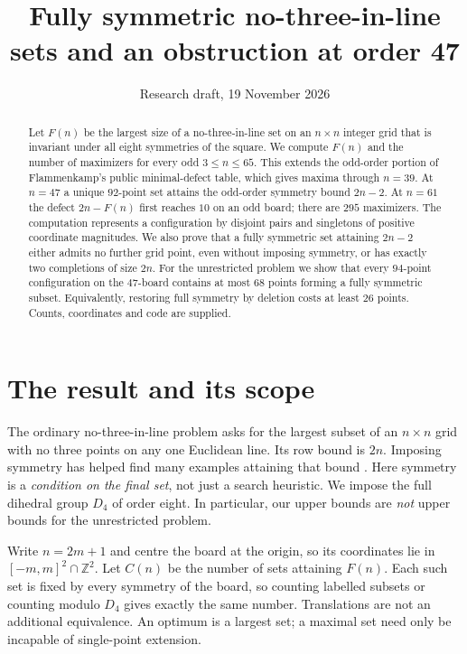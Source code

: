 \documentclass[11pt]{article}
\title{Fully symmetric no-three-in-line sets and an obstruction at order 47}
\author{} %
\date{Research draft, 19 November 2026}
\newcommand{\lastorder}{65}
\newcommand{\D}{D_4}
\begin{document}
\maketitle
\begin{abstract}
Let $F(n)$ be the largest size of a no-three-in-line set on an $n\times n$ integer grid that is invariant under all eight symmetries of the square. We compute $F(n)$ and the number of maximizers for every odd $3\le n\le\lastorder$. This extends the odd-order portion of Flammenkamp's public minimal-defect table, which gives maxima through $n=39$. At $n=47$ a unique $92$-point set attains the odd-order symmetry bound $2n-2$. At $n=61$ the defect $2n-F(n)$ first reaches $10$ on an odd board; there are $295$ maximizers. The computation represents a configuration by disjoint pairs and singletons of positive coordinate magnitudes. We also prove that a fully symmetric set attaining $2n-2$ either admits no further grid point, even without imposing symmetry, or has exactly two completions of size $2n$. For the unrestricted problem we show that every $94$-point configuration on the $47$-board contains at most $68$ points forming a fully symmetric subset. Equivalently, restoring full symmetry by deletion costs at least $26$ points. Counts, coordinates and code are supplied.
\end{abstract}

\section{The result and its scope}
The ordinary no-three-in-line problem asks for the largest subset of an $n\times n$ grid with no three points on any one Euclidean line. Its row bound is $2n$. Imposing symmetry has helped find many examples attaining that bound \cite{flam92,flam98,prell}. Here symmetry is a \emph{condition on the final set}, not just a search heuristic. We impose the full dihedral group $\D$ of order eight. In particular, our upper bounds are \emph{not} upper bounds for the unrestricted problem.

Write $n=2m+1$ and centre the board at the origin, so its coordinates lie in $[-m,m]^2\cap\mathbb Z^2$. Let $C(n)$ be the number of sets attaining $F(n)$. Each such set is fixed by every symmetry of the board, so counting labelled subsets or counting modulo $\D$ gives exactly the same number. Translations are not an additional equivalence. An optimum is a largest set; a maximal set need only be incapable of single-point extension.
\end{document}
